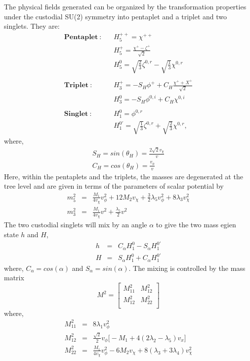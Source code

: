 The physical fields generated can be organized by the transformation properties under the custodial SU(2) symmetry into pentaplet and a triplet and two singlets. They are:
\begin{eqnarray}
    \mathbf{Pentaplet}~:&   & H^{++}_5 = \chi^{++} \\
                        &   & H^+_5 = \frac{\chi^+ - \zeta^+}{\sqrt{2}} \\
                        &   & H^0_5 = \sqrt{\frac{2}{3}}\zeta^{0,r} - \sqrt{\frac{1}{3}}\chi^{0,r} \\
                        &   & \\
    \mathbf{Triplet}~:  &   & H^+_3 = -S_H \phi^+ + C_H \frac{\chi^++X^+}{\sqrt{2}} \\
                        &   & H^0_3 = -S_H \phi^{0,i} + C_H \chi^{0,i} \\
                        &   & \\
    \mathbf{Singlet}~:  &   & H^0_1 = \phi^{0,r}\\
                        &   & H^{0'}_1 = \sqrt{\frac{1}{3}}\zeta^{0,r} + \sqrt{\frac{2}{3}} \chi^{0,r},
\end{eqnarray}
where,
\begin{eqnarray}
    S_H = sin(\theta_H) = \frac{2\sqrt{2} v_\chi}{v} \\
    C_H = cos(\theta_H) = \frac{v_\phi}{v}
\end{eqnarray}
Here, within the pentaplets and the triplets, the masses are degenerated at the tree level and are given in terms of the parameters of scalar potential by
\begin{eqnarray}
    m_5^2 & = & \frac{M_1}{4v_\chi} v_{\phi}^2 + 12 M_2 v_{\chi} + \frac{3}{2}\lambda_5 v^2_{\phi} + 8 \lambda_3 v_{\chi}^2 \\
    m_3^2 & = & \frac{M_1}{4v_\chi} v^2 + \frac{\lambda_5}{2} v^2 
\end{eqnarray}
The two custodial singlets will  mix by an angle $\alpha$ to give the two mass egien state $h$ and $H$,
\begin{eqnarray}
    h & = & C_{\alpha} H^0_1 - S_{\alpha} H^{0'}_1 \\
    H & = & S_{\alpha} H^0_1 + C_{\alpha} H^{0'}_1
\end{eqnarray}
where, $C_{\alpha} = cos(\alpha)$ and $S_{\alpha} = sin(\alpha)$. The mixing is controlled by the mass matrix
\begin{equation}
    M^2 = 
        \begin{bmatrix}
            M_{11}^2 & M^2_{12} \\
            M_{12}^2 & M^2_{22} \\
        \end{bmatrix}
\end{equation}
where,
\begin{eqnarray}
    M^2_{11} & = & 8 \lambda_1 v^2_{\phi} \\
    M^2_{12} & = & \frac{\sqrt{2}}{2} v_{\phi} \Big[-M_1 + 4(2\lambda_2 - \lambda_5) v_x \Big] \\
    M^2_{22} & = & \frac{M_1}{4 v_{\chi}}v^2_{\phi} - 6 M_2 v_{\chi} + 8(\lambda_3 + 3\lambda_4) v^2_{\chi}
\end{eqnarray}

